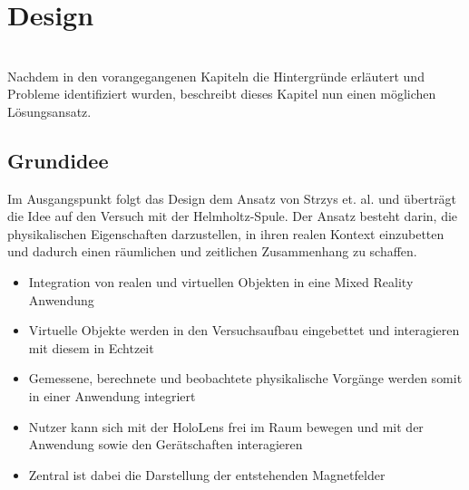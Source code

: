 \section{Design}
\label{sec-4}
\\

Nachdem in den vorangegangenen Kapiteln die Hintergründe erläutert und Probleme identifiziert wurden, beschreibt dieses Kapitel nun einen möglichen Lösungsansatz.

\subsection{Grundidee}
Im Ausgangspunkt folgt das Design dem Ansatz von Strzys et. al. und überträgt die Idee auf den Versuch mit der Helmholtz-Spule. Der Ansatz besteht darin, die physikalischen Eigenschaften darzustellen, in ihren realen Kontext einzubetten und dadurch einen räumlichen und zeitlichen Zusammenhang zu schaffen.\\

\begin{itemize}[topsep=-2px]
	\setlength{\itemsep}{-5pt}
	\item Integration von realen und virtuellen Objekten in eine Mixed Reality Anwendung
	\item Virtuelle Objekte werden in den Versuchsaufbau eingebettet und interagieren mit diesem in Echtzeit
	\item Gemessene, berechnete und beobachtete physikalische Vorgänge werden somit in einer Anwendung integriert
	\item Nutzer kann sich mit der HoloLens frei im Raum bewegen und mit der Anwendung sowie den Gerätschaften interagieren
	\item Zentral ist dabei die Darstellung der entstehenden Magnetfelder
\end{itemize}

